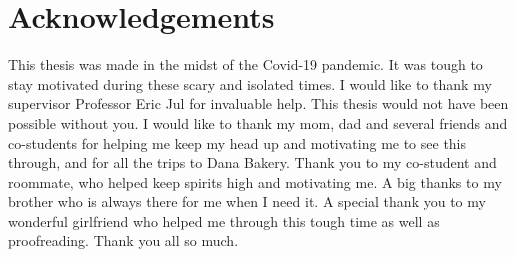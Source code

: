 \chapter*{Acknowledgements}
This thesis was made in the midst of the Covid-19 pandemic. It was tough to stay motivated during these scary and isolated times. I would like to thank my supervisor Professor Eric Jul for invaluable help. This thesis would not have been possible without you. I would like to thank my mom, dad and several friends and co-students for helping me keep my head up and motivating me to see this through, and for all the trips to Dana Bakery. Thank you to my co-student and roommate, who helped keep spirits high and motivating me. A big thanks to my brother who is always there for me when I need it. A special thank you to my wonderful girlfriend who helped me through this tough time as well as proofreading. Thank you all so much. 